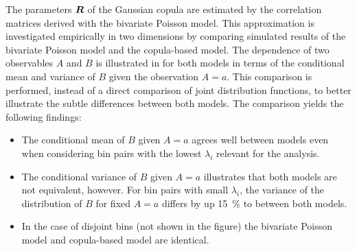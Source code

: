 The parameters $\bm{R}$ of the Gaussian copula are estimated by the
correlation matrices derived with the bivariate Poisson model. This
approximation is investigated empirically in two dimensions by comparing
simulated results of the bivariate Poisson model and the copula-based model. The
dependence of two observables $A$ and $B$ is illustrated in
 for both models in terms of the conditional
mean and variance of $B$ given the observation $A = a$. This comparison is
performed, instead of a direct comparison of joint distribution functions, to
better illustrate the subtle differences between both models. The comparison
yields the following findings:
\begin{itemize}

\item The conditional mean of $B$ given $A = a$ agrees well between models even
  when considering bin pairs with the lowest $\lambda_i$ relevant for the
  analysis.

\item The conditional variance of $B$ given $A = a$ illustrates that both models
  are not equivalent, however. For bin pairs with small $\lambda_i$, the
  variance of the distribution of $B$ for fixed $A = a$ differs by up
  \SI{15}{\percent} to between both models.

\item In the case of disjoint bins (not shown in the figure) the bivariate
  Poisson model and copula-based model are identical.

\end{itemize}

